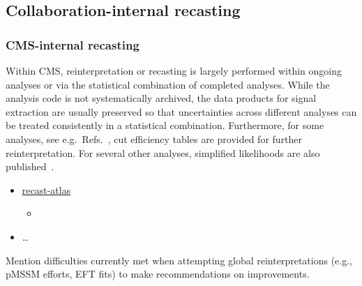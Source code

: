 \documentclass[11pt]{article}
\begin{document}
\subsection{Collaboration-internal recasting}



\subsubsection{CMS-internal recasting}

Within CMS, reinterpretation or recasting is largely performed within ongoing analyses or via the statistical combination of completed analyses. While the analysis code is not systematically archived, the data products for signal extraction are usually preserved so that uncertainties across different analyses can be treated consistently in a statistical combination. Furthermore, for some analyses, see e.g.\ Refs.~\cite{CMS:2017may,CMS:2018tuo}, cut efficiency tables are provided for further reinterpretation. For several other analyses, simplified likelihoods are also published~\cite{CMS:2017nxf,CMS:2017zts,CMS:2018ffd,CMS:2018eqb}.

\begin{itemize}
    \item \href{https://github.com/recast-hep/recast-atlas}{recast-atlas}
        \begin{itemize}
            \item {}
        \end{itemize}
    \item \ldots
\end{itemize}

Mention difficulties currently met when attempting global reinterpretations (e.g., pMSSM efforts, EFT fits) to make recommendations on improvements.


\end{document}
